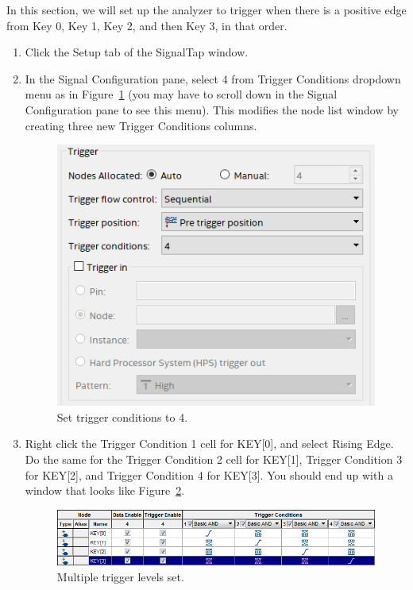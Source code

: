 \documentclass[11pt, twoside, pdftex]{article}
\begin{document}
In this section, we will set up the analyzer to trigger when there is a positive edge from Key 0, Key 1,
Key 2, and then Key 3, in that order.
\begin{enumerate}
\item Click the {\sf Setup} tab of the SignalTap window.
  
\item In the Signal Configuration pane, select 4 from Trigger Conditions dropdown menu as in Figure~\ref{fig:14} (you may have to scroll down in the Signal Configuration pane to see this menu). This modifies the node list
window by creating three new Trigger Conditions columns.
  
\begin{figure}[H]
   \begin{center}
      \includegraphics[scale=0.65]{figures/figure14.png}
   \caption{Set trigger conditions to 4.} 
	 \label{fig:14}
	 \end{center}
\end{figure}

\item Right click the Trigger Condition 1 cell for KEY[0], and select {\sf Rising Edge}. Do the same for the Trigger Condition 2 cell
for KEY[1], Trigger Condition 3 for KEY[2], and Trigger Condition 4 for KEY[3]. You should end up with a window that looks
like Figure~\ref{fig:15}.

\begin{figure}[H]
   \begin{center}
      \includegraphics[scale=0.65]{figures/figure15.png}
   \caption{Multiple trigger levels set.} 
	 \label{fig:15}
	 \end{center}
\end{figure}


\end{enumerate}
\end{document}
